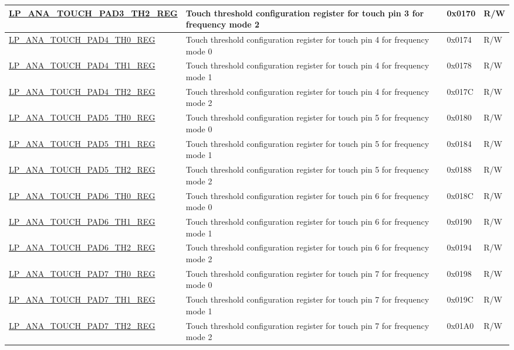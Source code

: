 \begin{longtable}{ | l | p{12cm} | p{1.3cm} | p{1.2cm} | }
\hyperref[regdesc:LPANATOUCHPAD0TH2REG]{LP\_ANA\_TOUCH\_PAD3\_TH2\_REG} & Touch threshold configuration register for touch pin 3 for frequency mode 2  & 0x0170 & R/W \\ \hline
\hyperref[regdesc:LPANATOUCHPAD0TH0REG]{LP\_ANA\_TOUCH\_PAD4\_TH0\_REG} & Touch threshold configuration register for touch pin 4 for frequency mode 0  & 0x0174 & R/W \\ \hline
\hyperref[regdesc:LPANATOUCHPAD0TH1REG]{LP\_ANA\_TOUCH\_PAD4\_TH1\_REG} & Touch threshold configuration register for touch pin 4 for frequency mode 1  & 0x0178 & R/W \\ \hline
\hyperref[regdesc:LPANATOUCHPAD0TH2REG]{LP\_ANA\_TOUCH\_PAD4\_TH2\_REG} & Touch threshold configuration register for touch pin 4 for frequency mode 2  & 0x017C & R/W \\ \hline
\hyperref[regdesc:LPANATOUCHPAD0TH0REG]{LP\_ANA\_TOUCH\_PAD5\_TH0\_REG} & Touch threshold configuration register for touch pin 5 for frequency mode 0  & 0x0180 & R/W \\ \hline
\hyperref[regdesc:LPANATOUCHPAD0TH1REG]{LP\_ANA\_TOUCH\_PAD5\_TH1\_REG} & Touch threshold configuration register for touch pin 5 for frequency mode 1  & 0x0184 & R/W \\ \hline
\hyperref[regdesc:LPANATOUCHPAD0TH2REG]{LP\_ANA\_TOUCH\_PAD5\_TH2\_REG} & Touch threshold configuration register for touch pin 5 for frequency mode 2  & 0x0188 & R/W \\ \hline
\hyperref[regdesc:LPANATOUCHPAD0TH0REG]{LP\_ANA\_TOUCH\_PAD6\_TH0\_REG} & Touch threshold configuration register for touch pin 6 for frequency mode 0  & 0x018C & R/W \\ \hline
\hyperref[regdesc:LPANATOUCHPAD0TH1REG]{LP\_ANA\_TOUCH\_PAD6\_TH1\_REG} & Touch threshold configuration register for touch pin 6 for frequency mode 1  & 0x0190 & R/W \\ \hline
\hyperref[regdesc:LPANATOUCHPAD0TH2REG]{LP\_ANA\_TOUCH\_PAD6\_TH2\_REG} & Touch threshold configuration register for touch pin 6 for frequency mode 2  & 0x0194 & R/W \\ \hline
\hyperref[regdesc:LPANATOUCHPAD0TH0REG]{LP\_ANA\_TOUCH\_PAD7\_TH0\_REG} & Touch threshold configuration register for touch pin 7 for frequency mode 0  & 0x0198 & R/W \\ \hline
\hyperref[regdesc:LPANATOUCHPAD0TH1REG]{LP\_ANA\_TOUCH\_PAD7\_TH1\_REG} & Touch threshold configuration register for touch pin 7 for frequency mode 1  & 0x019C & R/W \\ \hline
\hyperref[regdesc:LPANATOUCHPAD0TH2REG]{LP\_ANA\_TOUCH\_PAD7\_TH2\_REG} & Touch threshold configuration register for touch pin 7 for frequency mode 2  & 0x01A0 & R/W \\ \hline

\end{longtable}
